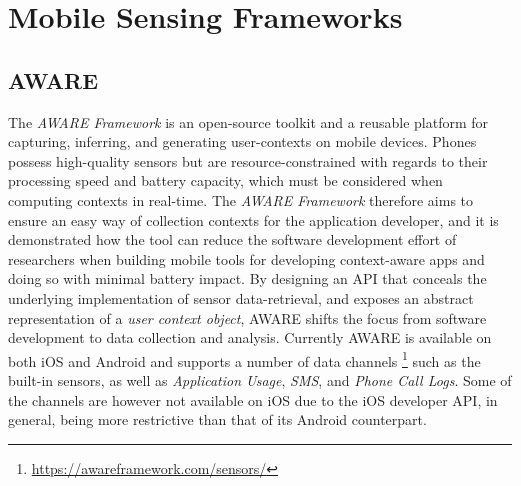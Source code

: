 \section{Mobile Sensing Frameworks}
\subsection{AWARE}
The \textit{AWARE Framework} \cite{aware2015} is an open-source toolkit and a reusable platform for capturing, inferring, and generating user-contexts on mobile devices. Phones possess high-quality sensors but are resource-constrained with regards to their processing speed and battery capacity, which must be considered when computing contexts in real-time. The \textit{AWARE Framework} therefore aims to ensure an easy way of collection contexts for the application developer, and it is demonstrated how the tool can reduce the software development effort of researchers when building mobile tools for developing context-aware apps and doing so with minimal battery impact. By designing an API that conceals the underlying implementation of sensor data-retrieval, and exposes an abstract representation of a \textit{user context object}, AWARE shifts the focus from software development to data collection and analysis. Currently AWARE is available on both iOS and Android and supports a number of data channels \footnote{\url{https://awareframework.com/sensors/}} such as the built-in sensors, as well as \textit{Application Usage}, \textit{SMS}, and \textit{Phone Call Logs}. Some of the channels are however not available on iOS due to the iOS developer API, in general, being more restrictive than that of its Android counterpart.

